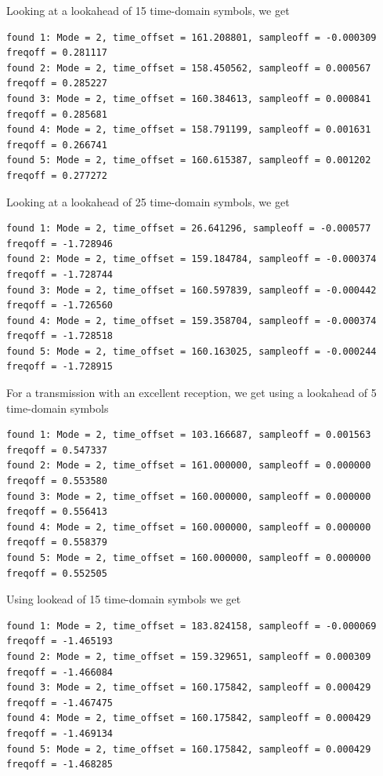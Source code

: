 \documentclass[11pt]{article}
\begin{document}
Looking at a lookahead of 15 time-domain symbols, we get
{\small
\begin{verbatim}
found 1: Mode = 2, time_offset = 161.208801, sampleoff = -0.000309 freqoff = 0.281117
found 2: Mode = 2, time_offset = 158.450562, sampleoff = 0.000567 freqoff = 0.285227
found 3: Mode = 2, time_offset = 160.384613, sampleoff = 0.000841 freqoff = 0.285681
found 4: Mode = 2, time_offset = 158.791199, sampleoff = 0.001631 freqoff = 0.266741
found 5: Mode = 2, time_offset = 160.615387, sampleoff = 0.001202 freqoff = 0.277272
\end{verbatim}
}

Looking at a lookahead of 25 time-domain symbols, we get
{\small
\begin{verbatim}
found 1: Mode = 2, time_offset = 26.641296, sampleoff = -0.000577 freqoff = -1.728946
found 2: Mode = 2, time_offset = 159.184784, sampleoff = -0.000374 freqoff = -1.728744
found 3: Mode = 2, time_offset = 160.597839, sampleoff = -0.000442 freqoff = -1.726560
found 4: Mode = 2, time_offset = 159.358704, sampleoff = -0.000374 freqoff = -1.728518
found 5: Mode = 2, time_offset = 160.163025, sampleoff = -0.000244 freqoff = -1.728915
\end{verbatim}
}

For a transmission with an excellent reception, we get using
a lookahead of 5 time-domain symbols
{\small
\begin{verbatim}
found 1: Mode = 2, time_offset = 103.166687, sampleoff = 0.001563 freqoff = 0.547337
found 2: Mode = 2, time_offset = 161.000000, sampleoff = 0.000000 freqoff = 0.553580
found 3: Mode = 2, time_offset = 160.000000, sampleoff = 0.000000 freqoff = 0.556413
found 4: Mode = 2, time_offset = 160.000000, sampleoff = 0.000000 freqoff = 0.558379
found 5: Mode = 2, time_offset = 160.000000, sampleoff = 0.000000 freqoff = 0.552505
\end{verbatim}
}

Using  lookead of 15 time-domain symbols we get
{\small
\begin{verbatim}
found 1: Mode = 2, time_offset = 183.824158, sampleoff = -0.000069 freqoff = -1.465193
found 2: Mode = 2, time_offset = 159.329651, sampleoff = 0.000309 freqoff = -1.466084
found 3: Mode = 2, time_offset = 160.175842, sampleoff = 0.000429 freqoff = -1.467475
found 4: Mode = 2, time_offset = 160.175842, sampleoff = 0.000429 freqoff = -1.469134
found 5: Mode = 2, time_offset = 160.175842, sampleoff = 0.000429 freqoff = -1.468285
\end{verbatim}
}
\end{document}
